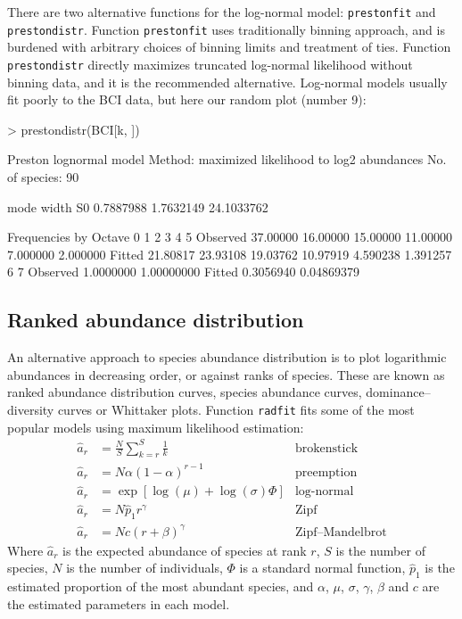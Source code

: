 \documentclass[a4paper,10pt]{amsart}
\begin{document}
There are two alternative functions for the log-normal model:
\texttt{prestonfit} and \texttt{prestondistr}.  Function
\texttt{prestonfit} uses traditionally binning approach, and is burdened
with arbitrary choices of binning limits and treatment of ties.
Function \texttt{prestondistr} directly
maximizes truncated log-normal likelihood without binning data, and it
is the recommended alternative.  Log-normal models  usually fit poorly
to the BCI data, but here our random plot (number 9):
\begin{Schunk}
\begin{Sinput}
> prestondistr(BCI[k, ])
\end{Sinput}
\begin{Soutput}
Preston lognormal model
Method: maximized likelihood to log2 abundances 
No. of species: 90 

      mode      width         S0 
 0.7887988  1.7632149 24.1033762 

Frequencies by Octave
                0        1        2        3        4        5
Observed 37.00000 16.00000 15.00000 11.00000 7.000000 2.000000
Fitted   21.80817 23.93108 19.03762 10.97919 4.590238 1.391257
                 6          7
Observed 1.0000000 1.00000000
Fitted   0.3056940 0.04869379
\end{Soutput}
\end{Schunk}

\subsection{Ranked abundance distribution}

An alternative approach to species abundance distribution is to plot
logarithmic abundances in decreasing order, or against ranks of
species.  These are known as ranked abundance
distribution curves, species abundance curves, dominance--diversity
curves or Whittaker plots.
Function \texttt{radfit} fits some of the most popular models using
maximum likelihood estimation:
\begin{align}
\hat a_r &= \frac{N}{S} \sum_{k=r}^S \frac{1}{k} &\text{brokenstick}\\
\hat a_r &= N \alpha (1-\alpha)^{r-1} & \text{preemption} \\
\hat a_r &= \exp \left[\log (\mu) + \log (\sigma) \Phi \right]
&\text{log-normal}\\
\hat a_r &= N \hat p_1 r^\gamma &\text{Zipf}\\
\hat a_r &= N c (r + \beta)^\gamma &\text{Zipf--Mandelbrot}
\end{align}
Where $\hat a_r$ is the expected abundance of species at rank $r$, $S$
is the number of species, $N$ is the number of individuals, $\Phi$ is
a standard normal function, $\hat p_1$ is the estimated proportion of
the most abundant species, and $\alpha$, $\mu$, $\sigma$, $\gamma$,
$\beta$ and $c$ are the estimated parameters in each model.
\end{document}
